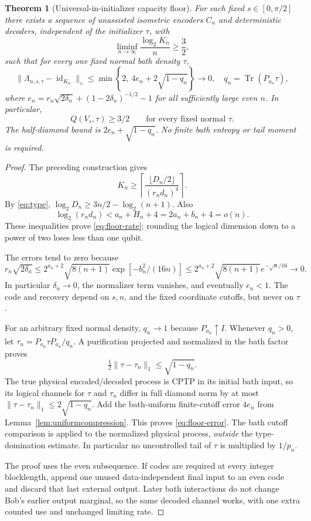 \documentclass[11pt]{article}
\newtheorem{theorem}{Theorem}[section]
\newcommand{\Tr}{\operatorname{Tr}}
\newcommand{\id}{\operatorname{id}}
\newcommand{\norm}[1]{\lVert #1\rVert}
\begin{document}
\begin{theorem}[Universal-in-initializer capacity floor]\label{thm:floor}
For each fixed $s\in[0,\pi/2]$ there exists a sequence of unassisted isometric encoders $C_n$ and deterministic decoders, independent of the initializer $\tau$, with
\begin{equation}
 \liminf_{n\to\infty}\frac{\log_2K_n}{n}\ge\frac32,
 \label{eq:floor-rate}
\end{equation}
such that for every one fixed normal bath density $\tau$,
\begin{equation}
 \norm{\Lambda_{n,s,\tau}-\id_{K_n}}_\diamond
 \le\min\left\{2,\ 4e_n+2\sqrt{1-q_n}\right\}\longrightarrow0,
 \quad q_n=\Tr(P_{a_n}\tau),
 \label{eq:floor-error}
\end{equation}
where $e_n=r_n\sqrt{2\delta_n}+(1-2\delta_n)^{-1/2}-1$ for all sufficiently large even $n$. In particular,
\begin{equation}
 Q(V_s,\tau)\ge3/2\qquad\text{for every fixed normal }\tau.
 \label{eq:capacityfloor}
\end{equation}
The half-diamond bound is $2e_n+\sqrt{1-q_n}$. No finite bath entropy or tail moment is required.
\end{theorem}
\begin{proof}
The preceding construction gives
\[
 K_n\ge\left\lceil\frac{\lfloor D_n/2\rfloor}{(r_nd_n)^4}\right\rceil.
\]
By \eqref{eq:type}, $\log_2D_n\ge3n/2-\log_2(n+1)$. Also
\[
 \log_2(r_nd_n)<a_n+H_n+4=2a_n+b_n+4=o(n).
\]
These inequalities prove \eqref{eq:floor-rate}; rounding the logical dimension down to a power of two loses less than one qubit.

The errors tend to zero because
\[
 r_n\sqrt{2\delta_n}
 \le 2^{a_n+2}\sqrt{8(n+1)}\exp[-b_n^2/(16n)]
 \le2^{a_n+2}\sqrt{8(n+1)}e^{-\sqrt n/16}\longrightarrow0.
\]
In particular $\delta_n\to0$, the normalizer term vanishes, and eventually $e_n<1$. The code and recovery depend on $s,n$, and the fixed coordinate cutoffs, but never on $\tau$.

For an arbitrary fixed normal density, $q_n\to1$ because $P_{a_n}\uparrow I$. Whenever $q_n>0$, let $\tau_n=P_{a_n}\tau P_{a_n}/q_n$. A purification projected and normalized in the bath factor proves
\[
 \tfrac12\norm{\tau-\tau_n}_1\le\sqrt{1-q_n}.
\]
The true physical encoded/decoded process is CPTP in its initial bath input, so its logical channels for $\tau$ and $\tau_n$ differ in full diamond norm by at most $\norm{\tau-\tau_n}_1\le2\sqrt{1-q_n}$. Add the bath-uniform finite-cutoff error $4e_n$ from Lemma~\ref{lem:uniformcompression}. This proves \eqref{eq:floor-error}. The bath cutoff comparison is applied to the normalized physical process, \emph{outside} the type-domination estimate. In particular no uncontrolled tail of $\tau$ is multiplied by $1/p_n$.

The proof uses the even subsequence. If codes are required at every integer blocklength, append one unused data-independent final input to an even code and discard that last external output. Later bath interactions do not change Bob's earlier output marginal, so the same decoded channel works, with one extra counted use and unchanged limiting rate.
\end{proof}
\end{document}
